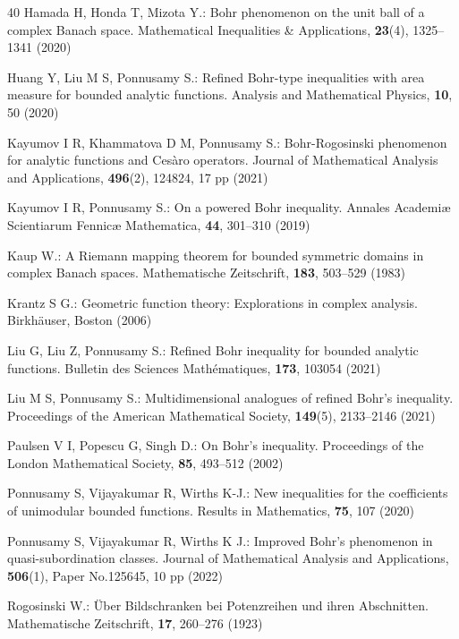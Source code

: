 \documentclass{birkjour}
\theoremstyle{plain}
\theoremstyle{definition}
\theoremstyle{definition}
\begin{document}
\begin{thebibliography}{40}
	Hamada H, Honda T, Mizota Y.: Bohr phenomenon on the unit ball of a complex Banach space. Mathematical Inequalities \& Applications, \textbf{23}(4), 1325--1341 (2020)
	
	Huang Y, Liu M S, Ponnusamy S.: Refined Bohr-type inequalities with area measure for bounded analytic functions. Analysis and Mathematical Physics, \textbf{10}, 50 (2020)
	
	Kayumov I R, Khammatova D M, Ponnusamy S.: Bohr-Rogosinski phenomenon for analytic functions and Cesàro operators. Journal of Mathematical Analysis and Applications, \textbf{496}(2), 124824, 17 pp (2021)
	
	Kayumov I R, Ponnusamy S.: On a powered Bohr inequality. Annales Academiæ Scientiarum Fennicæ Mathematica, \textbf{44}, 301--310 (2019)
	
	Kaup W.: A Riemann mapping theorem for bounded symmetric domains in complex Banach spaces. Mathematische Zeitschrift, \textbf{183}, 503--529 (1983)
	
	Krantz S G.: Geometric function theory: Explorations in complex analysis. Birkhäuser, Boston (2006)
	
	Liu G, Liu Z, Ponnusamy S.: Refined Bohr inequality for bounded analytic functions. Bulletin des Sciences Mathématiques, \textbf{173}, 103054 (2021)
	
	Liu M S, Ponnusamy S.: Multidimensional analogues of refined Bohr’s inequality. Proceedings of the American Mathematical Society, \textbf{149}(5), 2133--2146 (2021)
	
	Paulsen V I, Popescu G, Singh D.: On Bohr's inequality. Proceedings of the London Mathematical Society, \textbf{85}, 493--512 (2002)
	
	Ponnusamy S, Vijayakumar R, Wirths K-J.: New inequalities for the coefficients of unimodular bounded functions. Results in Mathematics, \textbf{75}, 107 (2020)
	
	Ponnusamy S, Vijayakumar R, Wirths K J.: Improved Bohr’s phenomenon in quasi-subordination classes. Journal of Mathematical Analysis and Applications, \textbf{506}(1), Paper No.125645, 10 pp (2022)
	
	Rogosinski W.: Über Bildschranken bei Potenzreihen und ihren Abschnitten. Mathematische Zeitschrift, \textbf{17}, 260--276 (1923)
	
\end{thebibliography}


\end{document}

